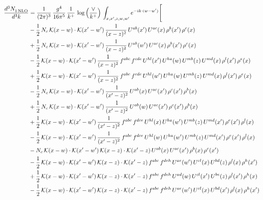 \documentclass[9pt]{article}
\numberwithin{equation}{section}
\begin{document}
\begin{align}
\frac{d^{3}N_{1\,\rm NLO}^{\rm}}{d^{3}k}  & = \frac{1}{(2\pi)^{3}}\,\frac{g^{4}}{16\pi^{5}}\,\frac{1}{k^{+}}\,\log{\left(\frac{\vee}{k^{+}}\right)}\, \int_{x,x',z,w,w'}e^{-ik\cdot (w-w')}\Bigg[\notag\\ &
-\frac{1}{2}\,N_{c}\,\mathcal{K}(x-w)\cdot\mathcal{K}(x'-w')\,\frac{1}{(x-z)^{2}}\,U^{ab}(x')\,U^{ac}(x)\,\rho^{b}(x')\,\rho^{c}(x)\notag\\
&+\frac{1}{2}\,N_{c}\,\mathcal{K}(x-w)\cdot\mathcal{K}(x'-w')\,\frac{1}{(x-z)^{2}}\,U^{ab}(w')\,U^{ac}(x)\,\rho^{b}(x')\,\rho^{c}(x)\notag\\
&-\frac{1}{2}\,\mathcal{K}(x-w)\cdot\mathcal{K}(x'-w')\,\frac{1}{(x-z)^{2}}\,f^{abc}\,f^{cde}\,U^{hl}(x')\,U^{ha}(w)\,U^{mb}(z)\,U^{md}(x)\,\rho^{l}(x')\,\rho^{e}(x)\notag\\
&+\frac{1}{2}\,\mathcal{K}(x-w)\cdot\mathcal{K}(x'-w')\,\frac{1}{(x-z)^{2}}\,f^{abc}\,f^{cde}\,U^{hl}(w')\,U^{ha}(w)\,U^{mb}(z)\,U^{md}(x)\,\rho^{l}(x')\,\rho^{e}(x)\notag\\
&-\frac{1}{2}\,N_{c}\,\mathcal{K}(x-w)\cdot\mathcal{K}(x'-w')\,\frac{1}{(x'-z)^{2}}\,U^{ab}(x)\,U^{ac}(x')\,\rho^{c}(x')\,\rho^{b}(x)\notag\\
&+\frac{1}{2}\,N_{c}\,\mathcal{K}(x-w)\cdot\mathcal{K}(x'-w')\,\frac{1}{(x'-z)^{2}}\,U^{ab}(w)\,U^{ac}(x')\,\rho^{c}(x')\,\rho^{b}(x)\notag\\
&+\frac{1}{2}\,\mathcal{K}(x-w)\cdot\mathcal{K}(x'-w')\,\frac{1}{(x'-z)^{2}}\,f^{abc}\,f^{dce}\,U^{hl}(x)\,U^{ha}(w')\,U^{mb}(z)\,U^{md}(x')\,\rho^{e}(x')\,\rho^{l}(x)\notag\\
&-\frac{1}{2}\,\mathcal{K}(x-w)\cdot\mathcal{K}(x'-w')\,\frac{1}{(x'-z)^{2}}\,f^{abc}\,f^{dce}\,U^{hl}(w)\,U^{ha}(w')\,U^{mb}(z)\,U^{md}(x')\,\rho^{e}(x')\,\rho^{l}(x)\notag\\
&-N_{c}\,\mathcal{K}(x-w)\cdot\mathcal{K}(x'-w')\,\mathcal{K}(x-z)\cdot\mathcal{K}(x'-z)\,U^{ab}(x)\,U^{ac}(x')\,\rho^{b}(x)\,\rho^{c}(x')\notag\\
&-\frac{1}{2}\,\mathcal{K}(x-w)\cdot\mathcal{K}(x'-w')\,\mathcal{K}(x-z)\cdot\mathcal{K}(x'-z)\,f^{abc}\,f^{deh}\,U^{ae}(w')\,U^{cl}(x)\,U^{bd}(z)\,\rho^{l}(x)\,\rho^{h}(x')\notag\\
&+\frac{1}{2}\,\mathcal{K}(x-w)\cdot\mathcal{K}(x'-w')\,\mathcal{K}(x-z)\cdot\mathcal{K}(x'-z)\,f^{abc}\,f^{deh}\,U^{ad}(w)\,U^{cl}(x')\,U^{be}(z)\,\rho^{l}(x')\,\rho^{h}(x)\notag\\
&-\frac{1}{2}\,\mathcal{K}(x-w)\cdot\mathcal{K}(x'-w')\,\mathcal{K}(x-z)\cdot\mathcal{K}(x'-z)\,f^{abc}\,f^{deh}\,U^{ae}(w')\,U^{cl}(x)\,U^{bd}(x')\,\rho^{l}(x)\,\rho^{h}(x')\notag\\

\end{align}
\end{document}
